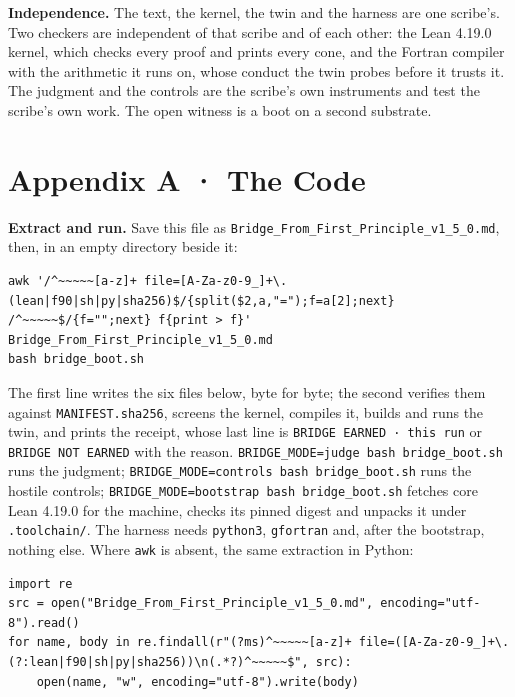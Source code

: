 \documentclass[10pt,twocolumn]{article}
\begin{document}
\textbf{Independence.} The text, the kernel, the twin and the harness
are one scribe's. Two checkers are independent of that scribe and of
each other: the Lean 4.19.0 kernel, which checks every proof and prints
every cone, and the Fortran compiler with the arithmetic it runs on,
whose conduct the twin probes before it trusts it. The judgment and the
controls are the scribe's own instruments and test the scribe's own
work. The open witness is a boot on a second substrate.

\onecolumn

\hypertarget{appendix-a-the-code}{%
\section{Appendix A · The Code}\label{appendix-a-the-code}}

\textbf{Extract and run.} Save this file as
\texttt{Bridge\_\allowbreak{}From\_\allowbreak{}First\_\allowbreak{}Principle\_\allowbreak{}v1\_\allowbreak{}5\_\allowbreak{}0.md}, then, in an empty
directory beside it:

\begin{Verbatim}
awk '/^~~~~~[a-z]+ file=[A-Za-z0-9_]+\.(lean|f90|sh|py|sha256)$/{split($2,a,"=");f=a[2];next} /^~~~~~$/{f="";next} f{print > f}' Bridge_From_First_Principle_v1_5_0.md
bash bridge_boot.sh
\end{Verbatim}

The first line writes the six files below, byte for byte; the second
verifies them against \texttt{MANIFEST.sha256}, screens the kernel,
compiles it, builds and runs the twin, and prints the receipt, whose
last line is \texttt{BRIDGE\ EARNED\ ·\ this\ run} or
\texttt{BRIDGE\ NOT\ EARNED} with the reason.
\texttt{BRIDGE\_\allowbreak{}MODE=judge\ bash\ bridge\_\allowbreak{}boot.sh} runs the judgment;
\texttt{BRIDGE\_\allowbreak{}MODE=controls\ bash\ bridge\_\allowbreak{}boot.sh} runs the hostile
controls; \texttt{BRIDGE\_\allowbreak{}MODE=bootstrap\ bash\ bridge\_\allowbreak{}boot.sh} fetches
core Lean 4.19.0 for the machine, checks its pinned digest and unpacks
it under \texttt{.toolchain/}. The harness needs \texttt{python3},
\texttt{gfortran} and, after the bootstrap, nothing else. Where
\texttt{awk} is absent, the same extraction in Python:

\begin{Verbatim}
import re
src = open("Bridge_From_First_Principle_v1_5_0.md", encoding="utf-8").read()
for name, body in re.findall(r"(?ms)^~~~~~[a-z]+ file=([A-Za-z0-9_]+\.(?:lean|f90|sh|py|sha256))\n(.*?)^~~~~~$", src):
    open(name, "w", encoding="utf-8").write(body)
\end{Verbatim}
\end{document}
